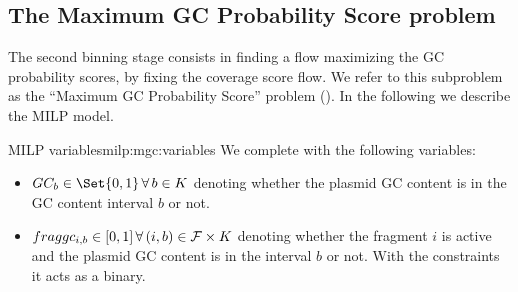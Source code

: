 \subsection{The Maximum GC Probability Score problem \MGC{}}\label{sec:method:mgc}

The second binning stage consists in finding a flow maximizing the GC probability scores, by fixing the coverage score flow.
We refer to this subproblem as the \enquote{Maximum GC Probability Score} problem (\MGC{}).
In the following we describe the MILP model.

\begin{definition}{\MGC{} MILP variables}{milp:mgc:variables}
  We complete  with the following variables:
  \begin{itemize}
    \item \(GC_b \in \Set{0, 1} \, \forall b \in K\) denoting whether the plasmid GC content is in the GC content interval \(b\) or not.
    \item \(\fraggc{i}{b} \in [0, 1] \, \forall (i, b) \in \Fragments{} \times K\) denoting whether the fragment \(i\) is active and the plasmid GC content is in the interval \(b\) or not. With the constraints it acts as a binary.
  \end{itemize}
\end{definition}

